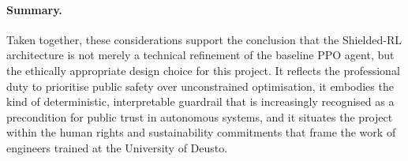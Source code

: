 \paragraph{Summary.}
Taken together, these considerations support the conclusion that the Shielded-RL
architecture is not merely a technical refinement of the baseline PPO agent, but the
ethically appropriate design choice for this project. It reflects the professional duty
to prioritise public safety over unconstrained optimisation, it embodies the kind of
deterministic, interpretable guardrail that is increasingly recognised as a precondition
for public trust in autonomous systems, and it situates the project within the human
rights and sustainability commitments that frame the work of engineers trained at the
University of Deusto.
